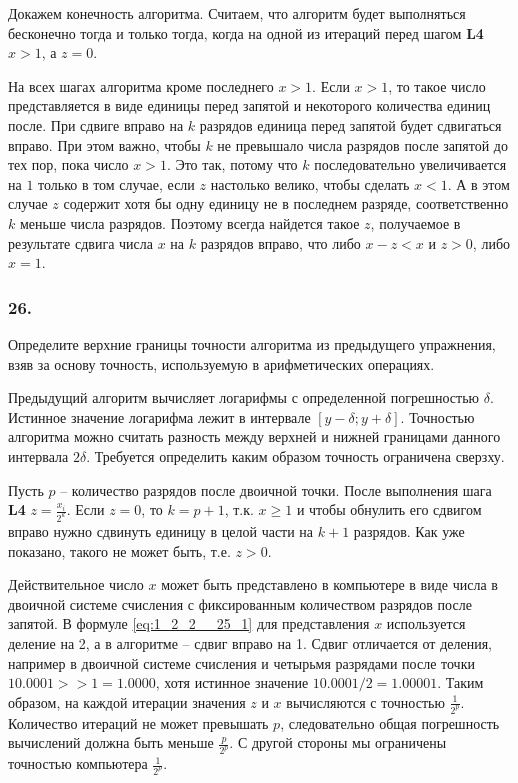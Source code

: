 \documentclass{book}
\begin{document}
Докажем конечность алгоритма. Считаем, что алгоритм будет выполняться бесконечно тогда и только тогда, когда на одной из итераций перед шагом \textbf{L4} $x>1$, а $z=0$.

На всех шагах алгоритма кроме последнего $x>1$. Если $x>1$, то такое число представляется в виде единицы перед запятой и некоторого количества единиц после. При сдвиге вправо на $k$ разрядов единица перед запятой будет сдвигаться вправо. При этом важно, чтобы $k$ не превышало числа разрядов после запятой до тех пор, пока число $x>1$. Это так, потому что $k$ последовательно увеличивается на $1$ только в том случае, если $z$ настолько велико, чтобы сделать $x < 1$. А в этом случае $z$ содержит хотя бы одну единицу не в последнем разряде, соответственно $k$ меньше числа разрядов.  Поэтому всегда найдется такое $z$, получаемое в результате сдвига числа $x$ на $k$ разрядов вправо, что либо $x-z < x$ и $z>0$, либо $x=1$.

\subsubsection{26.}

Определите верхние границы точности алгоритма из предыдущего упражнения, взяв за основу точность, используемую в арифметических операциях.

Предыдущий алгоритм вычисляет логарифмы с определенной погрешностью $\delta$. Истинное значение логарифма лежит в интервале $[y-\delta; y+\delta]$. Точностью алгоритма можно считать разность между верхней и нижней границами данного интервала $2\delta$. Требуется определить каким образом точность ограничена сверзху.

Пусть $p$ -- количество разрядов после двоичной точки. После выполнения шага \textbf{L4} $z=\frac{x_i}{2^k}$. Если $z=0$, то $k=p+1$, т.к. $x \geq 1$ и чтобы обнулить его сдвигом вправо нужно сдвинуть единицу в целой части на $k+1$ разрядов. Как уже показано, такого не может быть, т.е. $z>0$.

Действительное число $x$ может быть представлено в компьютере в виде числа в двоичной системе счисления с фиксированным количеством разрядов после запятой. В формуле \ref{eq:1_2_2__25_1} для представления $x$ используется деление на 2, а в алгоритме -- сдвиг вправо на 1. Сдвиг отличается от деления, например в двоичной системе счисления и четырьмя разрядами после точки $10.0001>>1=1.0000$, хотя истинное значение $10.0001/2=1.00001$. Таким образом, на каждой итерации значения $z$ и $x$ вычисляются с точностью $\frac{1}{2^p}$. Количество итераций не может превышать $p$, следовательно общая погрешность вычислений должна быть меньше $\frac{p}{2^p}$. С другой стороны мы ограничены точностью компьютера $\frac{1}{2^p}$.
\end{document}

